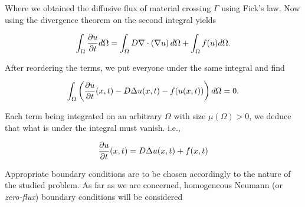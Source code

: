 \documentclass[12pt]{article}
\begin{document}
Where we obtained the diffusive flux of material crossing $\Gamma$ using Fick's law. Now using the divergence theorem on the second integral yields

$$\int_{\Omega} \frac{\partial u}{\partial t} d\Omega =  \int_\Omega D \nabla \cdot \left( \nabla u \right) d\Omega + \int_\Omega f(u) d\Omega.$$

After reordering the terms, we put everyone under the same integral and find

$$\int_\Omega \left( \frac{\partial u}{\partial t}(x, t) - D \Delta u (x, t) - f(u(x, t)) \right) d\Omega = 0.$$

Each term being integrated on an arbitrary $\Omega$ with size $\mu(\Omega) > 0$, we deduce that what is under the integral must vanish. i.e., 

\begin{equation}\label{eq:rdeq} \frac{\partial u }{\partial t}(x, t) = D \Delta u(x, t) + f(x, t)\end{equation}

Appropriate boundary conditions are to be chosen accordingly to the nature of the studied problem. As far as we are concerned, homogeneous Neumann (or \textit{zero-flux}) boundary conditions will be considered
\end{document}
